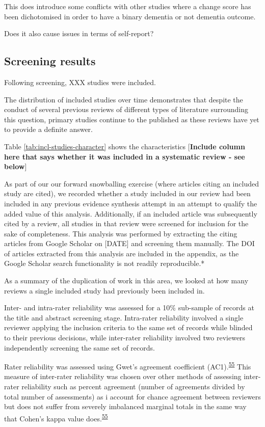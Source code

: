 \documentclass[a4paper, twoside]{templates/ociamthesis}
\begin{document}
This does introduce some conflicts with other studies where a change score has been dichotomised in order to have a binary dementia or not dementia outcome.

Does it also cause issues in terms of self-report?

\hypertarget{screening-results}{%
\subsection{Screening results}\label{screening-results}}

Following screening, XXX studies were included.

The distribution of included studies over time demonstrates that despite the conduct of several previous reviews of different types of literature surrounding this question, primary studies continue to the published as these reviews have yet to provide a definite answer.

Table \ref{tab:incl-studies-character} shows the characteristics {[}\textbf{Include column here that says whether it was included in a systematic review - see below}{]}

As part of our our forward snowballing exercise (where articles citing an included study are cited), we recorded whether a study included in our review had been included in any previous evidence synthesis attempt in an attempt to qualify the added value of this analysis. Additionally, if an included article was subsequently cited by a review, all studies in that review were screened for inclusion for the sake of completeness. This analysis was performed by extracting the citing articles from Google Scholar on {[}DATE{]} and screening them manually. The DOI of articles extracted from this analysis are included in the appendix, as the Google Scholar search functionality is not readily reproducible.*

As a summary of the duplication of work in this area, we looked at how many reviews a single included study had previously been included in.

Inter- and intra-rater reliability was assessed for a 10\% sub-sample of records at the title and abstract screening stage. Intra-rater reliability involved a single reviewer applying the inclusion criteria to the same set of records while blinded to their previous decisions, while inter-rater reliability involved two reviewers independently screening the same set of records.

Rater reliability was assessed using Gwet's agreement coefficient (AC1).\textsuperscript{\protect\hyperlink{ref-gwet2008}{55}} This measure of inter-rater reliability was chosen over other methods of assessing inter-rater reliability such as percent agreement (number of agreements divided by total number of assessments) as i account for chance agreement between reviewers but does not suffer from severely imbalanced marginal totals in the same way that Cohen's kappa value does.\textsuperscript{\protect\hyperlink{ref-gwet2008}{55}}
\end{document}
